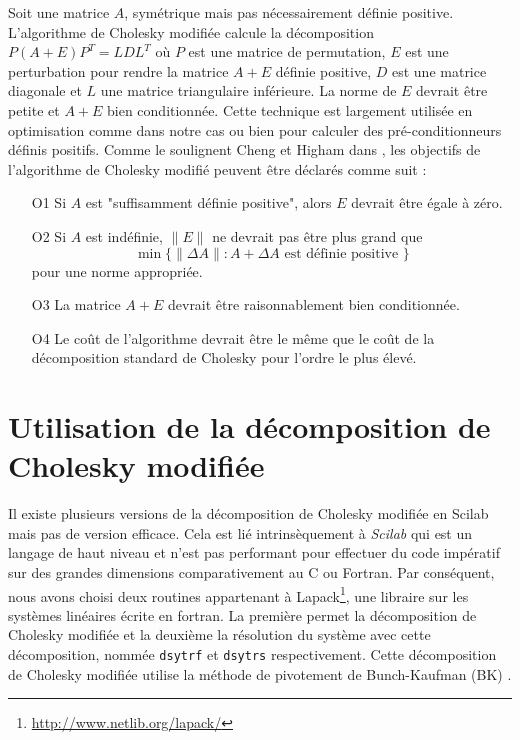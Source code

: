 Soit une matrice $A$, sym\'etrique mais pas n\'ecessairement d\'efinie positive. L'algorithme de Cholesky modifi\'ee
calcule la d\'ecomposition $P(A+E)P^T=LDL^T$ o\`u $P$ est une matrice de permutation, $E$ est une
perturbation pour rendre la matrice $A+E$ d\'efinie positive, $D$ est une matrice diagonale et 
$L$ une matrice triangulaire inf\'erieure. La norme de $E$ devrait être petite et $A+E$ 
bien conditionn\'ee. Cette technique est largement utilis\'ee en optimisation comme dans notre cas ou bien pour 
calculer des pr\'e-conditionneurs d\'efinis positifs.
Comme le soulignent Cheng et Higham dans \cite{Higham}, les objectifs de l'algorithme de Cholesky modifi\'e peuvent être d\'eclar\'es
comme suit :
\begin{itemize}
\item[O1] Si $A$ est "suffisamment d\'efinie positive", alors $E$ devrait être \'egale \`a z\'ero.
\item[O2] Si $A$ est ind\'efinie, $\lVert E \rVert$ ne devrait pas être plus grand que 
\[\min\{\lVert \Delta A \rVert: A+\Delta A \text{ est d\'efinie positive } \} \]
pour une norme appropri\'ee.
\item[O3] La matrice $A+E$ devrait être raisonnablement bien conditionn\'ee. 
\item[O4] Le coût de l'algorithme devrait être le même que le coût de la d\'ecomposition standard de Cholesky
 pour l'ordre le plus \'elev\'e.
\end{itemize}



  \section{Utilisation de la d\'ecomposition de Cholesky modifi\'ee}

\label{chap3:cholesky}

Il existe plusieurs versions de la d\'ecomposition de Cholesky modifi\'ee en Scilab mais pas 
de version efficace. Cela est li\'e intrins\`equement \`a {\it Scilab} qui est un langage de haut niveau et n'est pas performant pour effectuer du code
imp\'eratif sur des grandes dimensions comparativement au C ou Fortran.
Par cons\'equent, nous avons choisi deux routines appartenant \`a Lapack\footnote{\url{http://www.netlib.org/lapack/}}, une libraire sur les syst\`emes lin\'eaires \'ecrite en fortran.
 La premi\`ere permet la d\'ecomposition 
de Cholesky modifi\'ee et la deuxi\`eme la r\'esolution du syst\`eme avec cette d\'ecomposition, nomm\'ee {\tt dsytrf} et {\tt dsytrs} respectivement. 
Cette d\'ecomposition de Cholesky modifi\'ee utilise la m\'ethode de pivotement de Bunch-Kaufman (BK) \cite{Bunch}.

